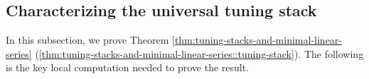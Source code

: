\documentclass[a4paper,12pt]{amsart}
\newtheorem{prop}[thm]{Proposition}
\theoremstyle{definition}
\newcommand{\cX}{\mathcal{X}}
\newcommand{\cU}{\mathcal{U}}
\newcommand{\cY}{\mathcal{Y}}
\begin{document}
	\subsection{Characterizing the universal tuning stack}
	
	In this subsection, we prove Theorem \ref{thm:tuning-stacks-and-minimal-linear-series} (\ref{thm:tuning-stacks-and-minimal-linear-series::tuning-stack}). The following is the key local computation needed to prove the result.
	
	
\end{document}
